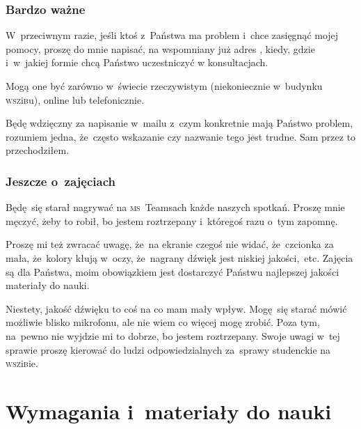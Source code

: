\documentclass[10pt,t]{beamer}
\begin{document}
\begin{frame}
  \frametitle{Bardzo ważne}


  W~przeciwnym razie, jeśli ktoś z~Państwa ma problem i~chce zasięgnąć
  mojej pomocy, proszę do mnie napisać, na wspomniany już adres \email,
  kiedy, gdzie i~w~jakiej formie chcą Państwo uczestniczyć w konsultacjach.

  Mogą one być zarówno w~świecie rzeczywistym (niekoniecznie w~budynku
  \textsc{wsz}i\textsc{b}u), online lub telefonicznie.

  Będę wdzięczny za napisanie w~mailu z~czym konkretnie mają Państwo
  problem, rozumiem jedna, że~często wskazanie czy nazwanie tego jest
  trudne. Sam przez to przechodziłem.

\end{frame}





\begin{frame}
  \frametitle{Jeszcze o~zajęciach}


  Będę~się starał nagrywać na \textsc{ms}~Teamsach każde naszych spotkań.
  Proszę mnie męczyć, żeby to robił, bo jestem roztrzepany i~któregoś
  razu o~tym zapomnę.

  Proszę mi też zwracać uwagę, że~na ekranie czegoś nie widać,
  że~czcionka za mała, że~kolory kłują w~oczy, że~nagrany dźwięk
  jest niskiej jakości,~etc. Zajęcia są dla Państwa, moim obowiązkiem jest
  dostarczyć Państwu najlepszej jakości materiały do nauki.

  Niestety, jakość dźwięku to coś na co mam mały wpływ. Mogę~się starać
  mówić możliwie blisko mikrofonu, ale nie wiem co więcej mogę zrobić.
  Poza tym, na~pewno nie wyjdzie mi to dobrze, bo jestem roztrzepany.
  Swoje uwagi w~tej sprawie proszę kierować do ludzi odpowiedzialnych
  za~sprawy studenckie na \textsc{wsz}i\textsc{b}ie.

\end{frame}










\section{Wymagania i~materiały do nauki}
\end{document}
